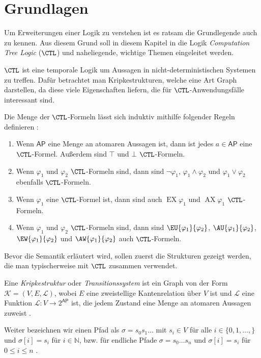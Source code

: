 \section{Grundlagen}
\label{ChapGrundlagen}

Um Erweiterungen einer Logik zu verstehen ist es ratsam die Grundlegende auch zu kennen. Aus diesem Grund soll in diesem Kapitel in die Logik \textit{Computation Tree Logic} ($\CTL$) und naheliegende, wichtige Themen eingeleitet werden.

$\CTL$ ist eine temporale Logik um Aussagen in nicht-deterministischen Systemen zu treffen. 
Dafür betrachtet man Kripkestrukturen, welche eine Art Graph darstellen, da diese viele Eigenschaften liefern, die für $\CTL$-Anwendungsfälle interessant sind.

\begin{definition}
	Die Menge der $\CTL$-Formeln lässt sich induktiv mithilfe folgender Regeln definieren \cite{clarke1982design, baier2008principles}:
	\begin{enumerate}
		\item Wenn $\mathsf{AP}$ eine Menge an atomaren Aussagen ist, dann ist jedes $a\in \mathsf{AP}$ eine $\CTL$-Formel. Außerdem sind $\top$ und $\bot$ $\CTL$-Formeln.
		\item Wenn $\varphi_1$ und $\varphi_2$ $\CTL$-Formeln sind, dann sind $\neg\varphi_1$, $\varphi_1 \land \varphi_2$ und $\varphi_1 \lor \varphi_2$ ebenfalls $\CTL$-Formeln.
		\item Wenn $\varphi_1$ eine $\CTL$-Formel ist, dann sind auch $\operatorname{EX}\varphi_1$ und $\operatorname{AX}\varphi_1$ $\CTL$-Formeln.
		\item Wenn $\varphi_1$ und $\varphi_2$ $\CTL$-Formeln sind, dann sind $\EU{\varphi_1}{\varphi_2}$, $\AU{\varphi_1}{\varphi_2}$, $\EW{\varphi_1}{\varphi_2}$ und $\AW{\varphi_1}{\varphi_2}$ auch $\CTL$-Formeln.
	\end{enumerate}
\end{definition}

Bevor die Semantik erläutert wird, sollen zuerst die Strukturen gezeigt werden, die man typischerweise mit $\CTL$ zusammen verwendet.

\begin{definition}[Kripkestrukturen]
	\label{DefKripkeStruk}
	Eine \textit{Kripkestruktur} oder \textit{Transitionssystem} ist ein Graph von der Form $\mathcal{K}=(V, E, \mathcal{L})$, wobei $E$ eine zweistellige Kantenrelation über $V$ ist und $\mathcal{L}$ eine Funktion $\mathcal{L}:V\to2^{\mathsf{AP}}$ ist, die jedem Zustand eine Menge an atomaren Aussagen zuweist 	\cite{clarke1982design,clarke1986automatic}.
	
	Weiter bezeichnen wir einen Pfad als $\sigma=s_0 s_1 \dots$ mit $s_i\in V$ für alle $i\in\{0, 1,\dots,\}$ und $\sigma[i]=s_i$ für $i\in \mathbb{N}$, bzw. für endliche Pfade $\sigma = s_0 \dots s_n$ und $\sigma[i] = s_i$ für $0\leq i \leq n$ \cite{baier2008principles}.
\end{definition}

